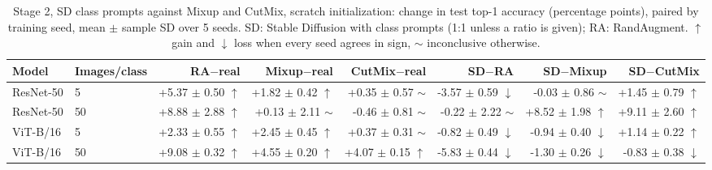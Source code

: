 \begin{table}[H]
\centering
\small
\setlength{\tabcolsep}{4pt}
\caption{Stage 2, SD class prompts against Mixup and CutMix, scratch initialization: change in test top-1 accuracy (percentage points), paired by training seed, mean $\pm$ sample SD over 5 seeds. SD: Stable Diffusion with class prompts (1:1 unless a ratio is given); RA: RandAugment. $\uparrow$ gain and $\downarrow$ loss when every seed agrees in sign, $\sim$ inconclusive otherwise.}
\label{tab:stage2-mixing-scratch-test}
\begin{tabular}{llrrrrrr}
\toprule
Model & Images/class & RA$-$real & Mixup$-$real & CutMix$-$real & SD$-$RA & SD$-$Mixup & SD$-$CutMix \\
\midrule
ResNet-50 & 5 & +5.37 $\pm$ 0.50 $\uparrow$ & +1.82 $\pm$ 0.42 $\uparrow$ & +0.35 $\pm$ 0.57 $\sim$ & -3.57 $\pm$ 0.59 $\downarrow$ & -0.03 $\pm$ 0.86 $\sim$ & +1.45 $\pm$ 0.79 $\uparrow$ \\
ResNet-50 & 50 & +8.88 $\pm$ 2.88 $\uparrow$ & +0.13 $\pm$ 2.11 $\sim$ & -0.46 $\pm$ 0.81 $\sim$ & -0.22 $\pm$ 2.22 $\sim$ & +8.52 $\pm$ 1.98 $\uparrow$ & +9.11 $\pm$ 2.60 $\uparrow$ \\
\midrule
ViT-B/16 & 5 & +2.33 $\pm$ 0.55 $\uparrow$ & +2.45 $\pm$ 0.45 $\uparrow$ & +0.37 $\pm$ 0.31 $\sim$ & -0.82 $\pm$ 0.49 $\downarrow$ & -0.94 $\pm$ 0.40 $\downarrow$ & +1.14 $\pm$ 0.22 $\uparrow$ \\
ViT-B/16 & 50 & +9.08 $\pm$ 0.32 $\uparrow$ & +4.55 $\pm$ 0.20 $\uparrow$ & +4.07 $\pm$ 0.15 $\uparrow$ & -5.83 $\pm$ 0.44 $\downarrow$ & -1.30 $\pm$ 0.26 $\downarrow$ & -0.83 $\pm$ 0.38 $\downarrow$ \\
\bottomrule
\end{tabular}
\end{table}

